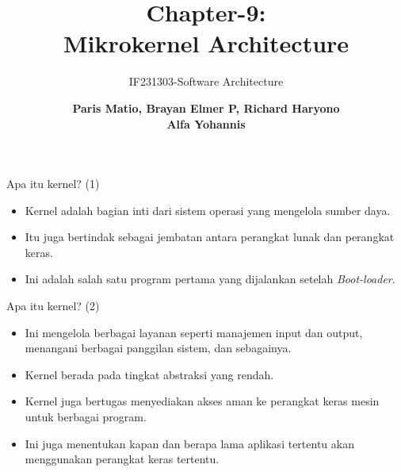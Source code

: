 \documentclass[aspectratio=169, table]{beamer}
\subtitle{IF231303-Software Architecture}
\title{\huge Chapter-9:\\Mikrokernel Architecture}
\author[Pradita]{\small {\textbf{Paris Matio, Brayan Elmer P, Richard Haryono\\ Alfa Yohannis}}}
\begin{document}
    \begin{frame}[plain]
        \maketitle
    \end{frame}

    \begin{frame}{Apa itu kernel? (1)}
        \begin{itemize}
            \item Kernel adalah bagian inti dari sistem operasi yang mengelola sumber daya.
            \item Itu juga bertindak sebagai jembatan antara perangkat lunak dan perangkat keras.
            \item Ini adalah salah satu program pertama yang dijalankan setelah \textit{Boot-loader}.
        \end{itemize}
    \end{frame}


    \begin{frame}{Apa itu kernel? (2)}
        \begin{itemize}
            \item Ini mengelola berbagai layanan seperti manajemen input dan output, menangani berbagai panggilan sistem, dan sebagainya.
            \item Kernel berada pada tingkat abstraksi yang rendah.
            \item Kernel juga bertugas menyediakan akses aman ke perangkat keras mesin untuk   berbagai program.
            \item Ini juga menentukan kapan dan berapa lama aplikasi tertentu akan menggunakan perangkat keras tertentu.
        \end{itemize}
    \end{frame}
\end{document}
